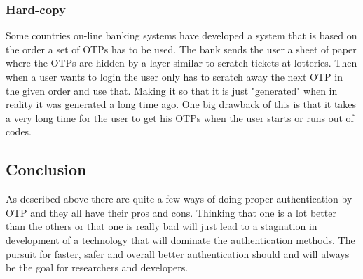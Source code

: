 \documentclass{article}
\begin{document}
            \subsubsection{Hard-copy}
            Some countries on-line banking systems have developed a system that is based on the order a set of OTPs has to be used. The bank sends the user a sheet of paper where the OTPs are hidden by a layer similar to scratch tickets at lotteries. Then when a user wants to login the user only has to scratch away the next OTP in the given order and use that. Making it so that it is just "generated" when in reality it was generated a long time ago. One big drawback of this is that it takes a very long time for the user to get his OTPs when the user starts or runs out of codes.
    \subsection{Conclusion}
    As described above there are quite a few ways of doing proper authentication by OTP and they all have their pros and cons. Thinking that one is a lot better than the others or that one is really bad will just lead to a stagnation in development of a technology that will dominate the authentication methods. The pursuit for faster, safer and overall better authentication should and will always be the goal for researchers and developers.
			
		
        
    \clearpage
	\nocite{*}
	
	
\end{document}

